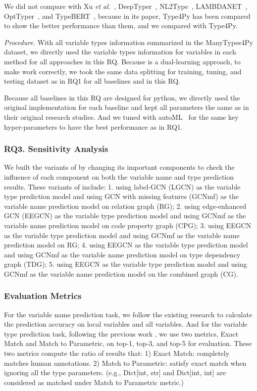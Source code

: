We did not compare with Xu {\em et al.}~\cite{xu-fse16},
DeepTyper~\cite{DeepTyper-fse18}, NL2Type~\cite{nl2type-icse19},
LAMBDANET~\cite{LambdaNet-iclr20}, OptTyper~\cite{optyper20}, and
TypeBERT~\cite{typeBERT-fse21}, because in its paper, Type4Py has been
compared to show the better performance than them, and we compared
with Type4Py.


\textit{Procedure.} With all variable types information summarized in the ManyTypes4Py dataset, we directly used the variable types information for variables in each method for all approaches in this RQ. Because {\tool} is a dual-learning approach, to make {\tool} work correctly, we took the same data splitting for training, tuning, and testing dataset as in RQ1 for all baselines and {\tool} in this RQ.

Because all baselines in this RQ are designed for python, we directly used the original implementation for each baseline and kept all parameters the same as in their original research studies. And we tuned {\tool} with autoML~\cite{NNI} for the same key hyper-parameters to have the best performance as in RQ1.

\subsubsection{RQ3. Sensitivity Analysis}

We built the variants of {\tool} by changing its important components to check the influence of each component on both the variable name and type prediction results. These variants of {\tool} include: 1. using label-GCN (LGCN) as the variable type prediction model and using GCN with missing features (GCNmf) as the variable name prediction model on relation graph (RG); 2. using edge-enhanced GCN (EEGCN) as the variable type prediction model and using GCNmf as the variable name prediction model on code property graph (CPG); 3. using EEGCN as the variable type prediction model and using GCNmf as the variable name prediction model on RG; 4. using EEGCN as the variable type prediction model and using GCNmf as the variable name prediction model on type dependency graph (TDG); 5. using EEGCN as the variable type prediction model and using GCNmf as the variable name prediction model on the combined graph (CG).

\subsubsection*{Evaluation Metrics}

For the variable name prediction task, we follow the existing research \cite{tran2019recovering} to calculate the prediction accuracy on local variables and all variables. And for the variable type prediction task, following the previous work \cite{type-graph-icse22}, we use two metrics, Exact Match and Match to Parametric, on top-1, top-3, and top-5 for evaluation. These two metrics compute the ratio of results that: 1) Exact Match: completely matches human annotations. 2) Match to Parametric: satisfy exact match when ignoring all the type parameters. (e.g., Dict[int, str] and Dict[int, int] are considered as matched under Match to Parametric metric.)

